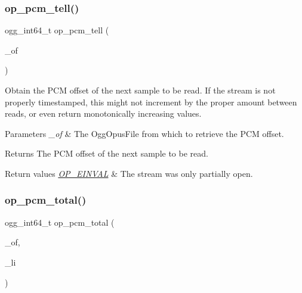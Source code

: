\subsubsection{\texorpdfstring{op\+\_\+pcm\+\_\+tell()}{op\_pcm\_tell()}}
{\footnotesize\ttfamily ogg\+\_\+int64\+\_\+t op\+\_\+pcm\+\_\+tell (\begin{DoxyParamCaption}\item[{\hyperlink{zconf_8h_a2c212835823e3c54a8ab6d95c652660e}{const} Ogg\+Opus\+File $\ast$}]{\+\_\+of }\end{DoxyParamCaption})}

Obtain the P\+CM offset of the next sample to be read. If the stream is not properly timestamped, this might not increment by the proper amount between reads, or even return monotonically increasing values. 
\begin{DoxyParams}{Parameters}
{\em \+\_\+of} & The {\ttfamily Ogg\+Opus\+File} from which to retrieve the P\+CM offset. \\
\hline
\end{DoxyParams}
\begin{DoxyReturn}{Returns}
The P\+CM offset of the next sample to be read. 
\end{DoxyReturn}

\begin{DoxyRetVals}{Return values}
{\em \hyperlink{group__error__codes_gae0879acafe9cc0ab72462d291fdb6fb6}{O\+P\+\_\+\+E\+I\+N\+V\+AL}} & The stream was only partially open. \\
\hline
\end{DoxyRetVals}
\mbox{\label{group__stream__info_ga8c228c3d95f2c903ad6cfd2b78d8dad6}} 
\subsubsection{\texorpdfstring{op\+\_\+pcm\+\_\+total()}{op\_pcm\_total()}}
{\footnotesize\ttfamily ogg\+\_\+int64\+\_\+t op\+\_\+pcm\+\_\+total (\begin{DoxyParamCaption}\item[{\hyperlink{zconf_8h_a2c212835823e3c54a8ab6d95c652660e}{const} Ogg\+Opus\+File $\ast$}]{\+\_\+of,  }\item[{int}]{\+\_\+li }\end{DoxyParamCaption})}

